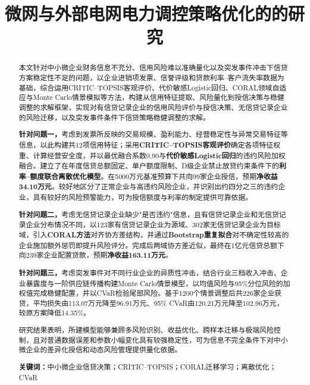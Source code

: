 \documentclass[UTF8,a4paper,12pt,fontset=fandol]{ctexart}
\title{\heiti\bfseries 微网与外部电网电力调控策略优化的的研究}
\author{}
\date{}
\numberwithin{equation}{section}
\begin{document}
\vspace{-5.5em}
\maketitle
\vspace{-2.2em}

\begin{abstract}
本文针对中小微企业财务信息不充分、信用风险难以准确量化以及突发事件冲击下信贷方案稳定性不足的问题，以企业进销项发票、信誉评级和贷款利率--客户流失率数据为基础，综合运用CRITIC--TOPSIS客观评价、代价敏感Logistic回归、CORAL领域自适应与Monte Carlo情景模拟等方法，构建从信用特征提取、风险量化到授信决策与稳健调整的求解框架，实现对有信贷记录企业的信用风险评价与授信决策、无信贷记录企业的风险迁移，以及突发事件条件下信贷策略稳健调整的求解。

\textbf{针对问题一，}考虑到发票所反映的交易规模、盈利能力、经营稳定性与异常交易特征等信息，以此构建共12项信用特征；采用\textbf{CRITIC--TOPSIS客观评价}确定各项特征权重、计算经营安全度，并以最优融合系数0.90与\textbf{代价敏感Logistic回归}的违约风险加权融合。建立了在年度信贷总额固定、单户额度限制、D级企业禁止放贷约束条件下的\textbf{利率--额度联合离散优化模型}。在5000万元基准预算下共向99家企业授信，预期\textbf{净收益34.10万元}。较好地区分了正常企业与高违约风险企业，并识别出约四分之三的违约企业，具有较好的风险预警能力，可为授信额度与利率的制定提供可靠依据。

\textbf{针对问题二，}考虑无信贷记录企业缺少"是否违约"信息，且有信贷记录企业和无信贷记录企业分布情况不同，以123家有信贷记录企业为源域、302家无信贷记录企业为目标域，引入\textbf{CORAL方法}对齐协方差结构，并通过\textbf{Bootstrap重复拟合}对不确定性较高的企业施加额外惩罚即提升风险评分。完成后两域协方差近似，最终在1亿元信贷总额下向239家企业配置贷款，预期\textbf{净收益163.11万元}。

\textbf{针对问题三，}考虑突发事件对不同行业企业的异质性冲击，结合行业三档收入冲击、企业暴露度与一阶供应链传播构建Monte Carlo情景模型，以均值风险与95\%分位风险的加权值完成稳健配置，并以CVaR检验尾部风险。基于1200个情景调整后共226家企业获贷，平均损失由113.07万元降至96.91万元、95\% CVaR由120.21万元降至102.96万元，较原方案降低14.35\%。

研究结果表明，所建模型能够兼顾多风险识别、收益优化、跨样本迁移与极端风险控制，且对普通数据误差和参数小幅变化具有较强稳定性，可为信息不完全条件下对中小微企业的差异化授信和动态风险管理提供量化依据。

\textbf{关键词：}中小微企业信贷决策；CRITIC--TOPSIS；CORAL迁移学习；离散优化；CVaR
\end{abstract}
\end{document}
